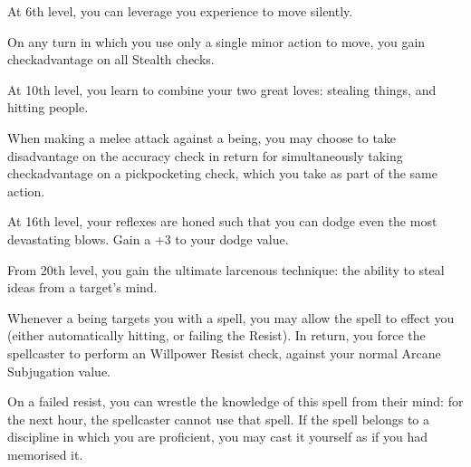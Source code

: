 {
At 6th level, you can leverage you experience to move silently. 

On any turn in which you use only a single minor action to move, you gain check\minus{}advantage on all Stealth checks. 
}
{
At 10th level, you learn to combine your two great loves: stealing things, and hitting people. 

When making a melee attack against a being, you may choose to take disadvantage on the accuracy check in return for simultaneously taking check\minus{}advantage on a pickpocketing check, which you take as part of the same action.
}

{
	At 16th level, your reflexes are honed such that you can dodge even the most devastating blows. Gain a +3 to your dodge value. 
}



{
From 20th level, you gain the ultimate larcenous technique: the ability to steal ideas from a target's mind.

Whenever a being targets you with a spell, you may allow the spell to effect you (either automatically hitting, or failing the Resist). In return, you force the spellcaster to perform an Willpower Resist check, against your normal Arcane Subjugation value. 

On a failed resist, you can wrestle the knowledge of this spell from their mind: for the next hour, the spellcaster cannot use that spell. If the spell belongs to a discipline in which you are proficient, you may cast it yourself as if you had memorised it.  
}

